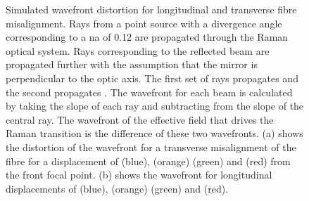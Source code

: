 \begin{figure}[!htbp]
	\centering
	\def\svgwidth{\columnwidth}
	\caption[Simulated wavefront distortion for longitudinal and transverse fibre
		misalignment]{Simulated wavefront distortion for longitudinal and transverse
		fibre misalignment. Rays from a point source with a divergence angle
		corresponding to a \ac{na} of 0.12 are propagated through the Raman optical
		system. Rays corresponding to the reflected beam are propagated further with
		the assumption that the mirror is perpendicular to the optic axis. The first
		set of rays propagates  and the second propagates
		. The wavefront for each beam is calculated by
		taking the slope of each ray and subtracting from the slope of the central
		ray. The wavefront of the effective field that drives the Raman transition
		is the difference of these two wavefronts. (a) shows the distortion of the
		wavefront for a transverse misalignment of the fibre for a displacement of
		 (blue),  (orange)
		 (green) and  (red) from
		the front focal point. (b) shows the wavefront for longitudinal
		displacements of  (blue),
		 (orange)
		 (green) and 
		(red).}\label{fig:fig_label}
\end{figure}
